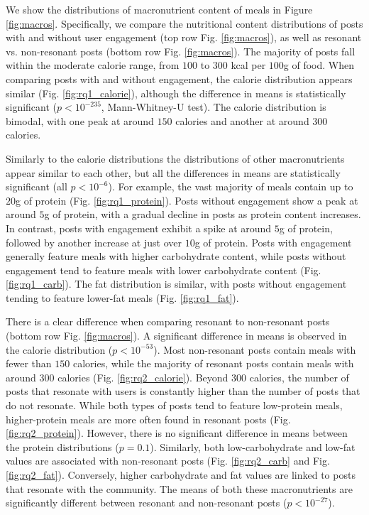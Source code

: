 We show the distributions of macronutrient content of meals in Figure \ref{fig:macros}. 
Specifically, we compare the nutritional content distributions of posts with and without user engagement (top row Fig. \ref{fig:macros}), as well as resonant vs. non-resonant posts (bottom row Fig. \ref{fig:macros}). 
The majority of posts fall within the moderate calorie range, from $100$ to $300$ kcal per $100$g of food.
When comparing posts with and without engagement, the calorie distribution appears similar (Fig. \ref{fig:rq1_calorie}), although the difference in means is statistically significant ($p < 10^{-235}$, Mann-Whitney-U test).
The calorie distribution is bimodal, with one peak at around $150$ calories and another at around $300$ calories.

Similarly to the calorie distributions the distributions of other macronutrients appear similar to each other, but all the differences in means are statistically significant (all $p < 10^{-6}$).
For example, the vast majority of meals contain up to $20$g of protein (Fig. \ref{fig:rq1_protein}).
Posts without engagement show a peak at around $5$g of protein, with a gradual decline in posts as protein content increases.
In contrast, posts with engagement exhibit a spike at around $5$g of protein, followed by another increase at just over $10$g of protein. 
Posts with engagement generally feature meals with higher carbohydrate content, while posts without engagement tend to feature meals with lower carbohydrate content (Fig. \ref{fig:rq1_carb}).
The fat distribution is similar, with posts without engagement tending to feature lower-fat meals (Fig. \ref{fig:rq1_fat}).

There is a clear difference when comparing resonant to non-resonant posts (bottom row Fig. \ref{fig:macros}).
A significant difference in means is observed in the calorie distribution ($p < 10^{-53}$).
Most non-resonant posts contain meals with fewer than $150$ calories, while the majority of resonant posts contain meals with around $300$ calories (Fig. \ref{fig:rq2_calorie}).
Beyond $300$ calories, the number of posts that resonate with users is constantly higher than the number of posts that do not resonate.
While both types of posts tend to feature low-protein meals, higher-protein meals are more often found in resonant posts (Fig. \ref{fig:rq2_protein}). However, there is no significant difference in means between the protein distributions ($p = 0.1$).
Similarly, both low-carbohydrate and low-fat values are associated with non-resonant posts (Fig. \ref{fig:rq2_carb} and Fig. \ref{fig:rq2_fat}).
Conversely, higher carbohydrate and fat values are linked to posts that resonate with the community.
The means of both these macronutrients are significantly different between resonant and non-resonant posts ($p < 10^{-27}$).